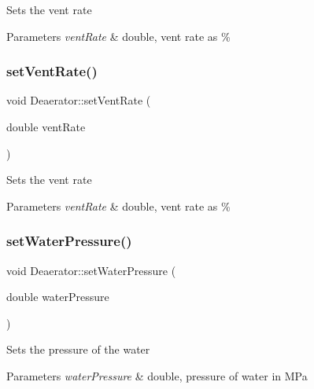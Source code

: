 Sets the vent rate 
\begin{DoxyParams}{Parameters}
{\em vent\+Rate} & double, vent rate as \% \\
\hline
\end{DoxyParams}
\mbox{\label{class_deaerator_a11e71194f58763a57ec0f7d05a21782d}} 
\subsubsection{\texorpdfstring{set\+Vent\+Rate()}{setVentRate()}\hspace{0.1cm}{\footnotesize\ttfamily [3/3]}}
{\footnotesize\ttfamily void Deaerator\+::set\+Vent\+Rate (\begin{DoxyParamCaption}\item[{double}]{vent\+Rate }\end{DoxyParamCaption})}

Sets the vent rate 
\begin{DoxyParams}{Parameters}
{\em vent\+Rate} & double, vent rate as \% \\
\hline
\end{DoxyParams}
\mbox{\label{class_deaerator_ae23f64c6983daed388a73c033a15e176}} 
\subsubsection{\texorpdfstring{set\+Water\+Pressure()}{setWaterPressure()}\hspace{0.1cm}{\footnotesize\ttfamily [1/3]}}
{\footnotesize\ttfamily void Deaerator\+::set\+Water\+Pressure (\begin{DoxyParamCaption}\item[{double}]{water\+Pressure }\end{DoxyParamCaption})}

Sets the pressure of the water 
\begin{DoxyParams}{Parameters}
{\em water\+Pressure} & double, pressure of water in M\+Pa \\
\hline
\end{DoxyParams}
\mbox{\label{class_deaerator_ae23f64c6983daed388a73c033a15e176}} 
